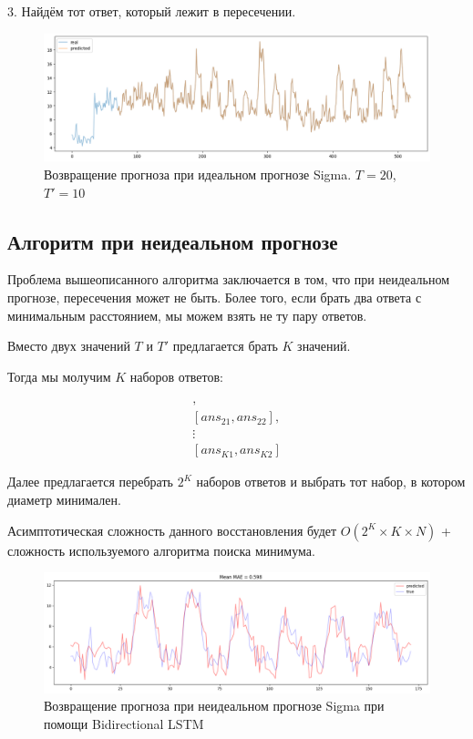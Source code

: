\documentclass{article}
\begin{document}
3. Найдём тот ответ, который лежит в пересечении.


\begin{figure}[H]
	\centering
	\includegraphics[width=\textwidth]{TwoTAlgo.png}
	\caption{Возвращение прогноза при идеальном прогнозе Sigma. $T=20$, $T'=10$}
	\label{fig:fig3}
\end{figure}

\subsection{Алгоритм при неидеальном прогнозе}

Проблема вышеописанного алгоритма заключается в том, что при неидеальном прогнозе, пересечения может не быть. Более того, если брать два ответа с минимальным расстоянием, мы можем взять не ту пару ответов.

Вместо двух значений  $T$ и $T'$ предлагается брать $K$ значений.

Тогда мы молучим $K$ наборов ответов:

\begin{gather*}
	[ans_{11}, ans_{12}],\\
	[ans_{21}, ans_{22}],\\
	\vdots \\
	[ans_{K1}, ans_{K2}]
\end{gather*}

Далее предлагается перебрать $2^K$ наборов ответов и выбрать тот набор, в котором диаметр минимален.

Асимптотическая сложность данного восстановления будет $O(2^K \times K \times N)$ + сложность используемого алгоритма поиска минимума.

\begin{figure}[H]
	\centering
	\includegraphics[width=\textwidth]{TbiLSTM.png}
	\caption{Возвращение прогноза при неидеальном прогнозе Sigma при помощи Bidirectional LSTM}
	\label{fig:fig4}
\end{figure}
\end{document}

